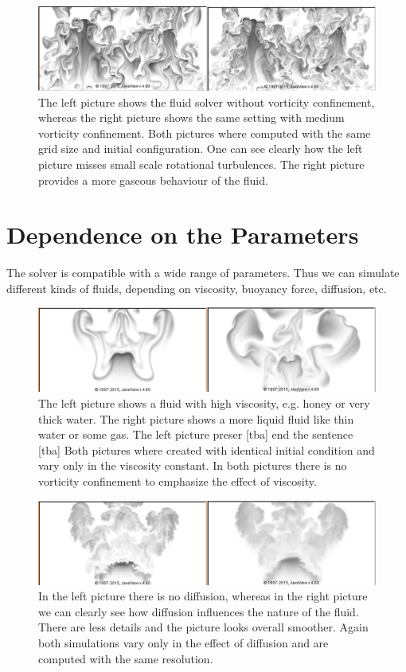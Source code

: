 \documentclass[a4paper,10pt,oneside,final,german,openbib,pdftex,titlepage]{scrbook}
\begin{document}
\begin{figure}[H]
 \centering
 \includegraphics[scale=0.30]{images/Vorticity.png}
 \caption{The left picture shows the fluid solver without vorticity confinement, whereas the right picture shows the same setting with medium vorticity confinement. Both pictures where computed with the same grid size and initial configuration. One can see clearly how the left picture misses small scale rotational turbulences. The right picture provides a more gaseous behaviour of the fluid.}
 \label{VorticityOnOff}
\end{figure}

\section{Dependence on the Parameters}
The solver is compatible with a wide range of parameters. Thus we can simulate different kinds of fluids, depending on viscosity, buoyancy force, diffusion, etc.

\begin{figure}[H]
 \centering
 \includegraphics[scale=0.30]{images/Viscosity-2.png}
 \caption{The left picture shows a fluid with high viscosity, e.g. honey or very thick water. The right picture shows a more liquid fluid like thin water or some gas. The left picture preser [tba] end the sentence [tba] Both pictures where created with identical initial condition and vary only in the viscosity constant. In both pictures there is no vorticity confinement to emphasize the effect of viscosity.}
 \label{ViscosityOnOff}
\end{figure}

\begin{figure}[H]
 \centering
 \includegraphics[scale=0.30]{images/Diffusion.png}
 \caption{In the left picture there is no diffusion, whereas in the right picture we can clearly see how diffusion influences the nature of the fluid. There are less details and the picture looks overall smoother. Again both simulations vary only in the effect of diffusion and are computed with the same resolution.}
 \label{ViscosityOnOff}
\end{figure}
\end{document}
